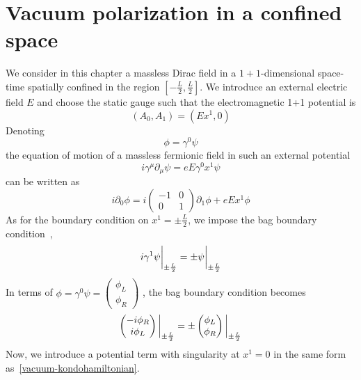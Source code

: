 \section{Vacuum polarization in a confined space}\label{sect-nef}
We consider in this chapter a massless Dirac field in a $1+1$-dimensional space-time spatially confined in the region $[-\frac L 2 , \frac L 2 ]$.
We introduce an external electric field $E$ and choose the static gauge such that the electromagnetic 1+1 potential is
\begin{equation*}
(A_0, A_1) = (E x^1, 0)
\end{equation*}
Denoting 
\begin{equation*}
\phi = \gamma^0\psi
\end{equation*} 
the equation of motion of a massless fermionic field in such an external potential 
\begin{equation*}
i\gamma^\mu\partial_\mu \psi = eE\gamma^0 x^1 \psi
\end{equation*}
can be written as
\begin{equation*}
i\partial_0\phi = i \begin{pmatrix} -1 & 0 \\ 0 & 1 \end{pmatrix}\partial_1\phi
+ eEx^1\phi
\end{equation*}
%
As for the boundary condition on $x^1 = \pm \frac L 2$, we impose the bag boundary condition~\cite{Chodos1974}, \ie 
\begin{equation*}
i\gamma^1 \psi \bigg\rvert_{\pm \frac{L}{2}} = \pm \psi \bigg\rvert_{\pm \frac{L}{2}}
\end{equation*}
In terms of $\phi = \gamma^0\psi = \begin{pmatrix} \phi_L \\ \phi_R \end{pmatrix}$
, the bag boundary condition becomes
\begin{equation}\label{vacuum-bagboundcond}
\begin{pmatrix}
-i \phi_R \\
i \phi_L
\end{pmatrix} \bigg\rvert_{\pm \frac{L}{2}} = \pm \begin{pmatrix}
\phi_L \\
\phi_R
\end{pmatrix} \bigg\rvert_{\pm \frac{L}{2}}
\end{equation}
%
Now, we introduce a potential term with singularity at $x^1 = 0$ in the same form as~\cref{vacuum-kondohamiltonian}.
